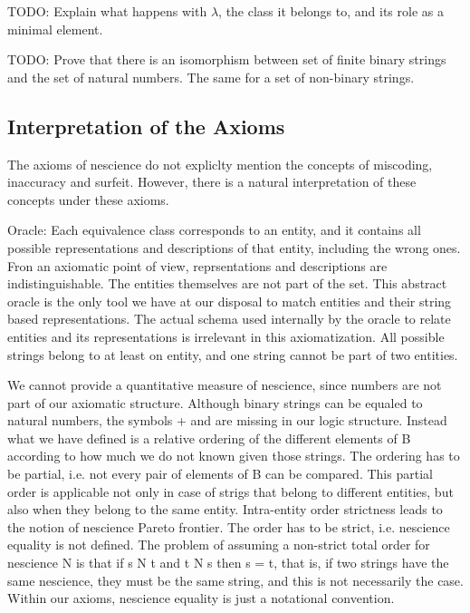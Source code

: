 {\color{red} TODO: Explain what happens with $\lambda$, the class it belongs to, and its role as a minimal element.}


{\color{red} TODO: Prove that there is an isomorphism between set of finite binary strings and the set of natural numbers. The same for a set of non-binary strings.}

%
%

\subsection{Interpretation of the Axioms}

The axioms of nescience do not expliclty mention the concepts of miscoding, inaccuracy and surfeit. However, there is a natural interpretation of these concepts under these axioms.


Oracle: Each equivalence class corresponds to an entity, and it contains all possible representations
and descriptions of that entity, including the wrong ones. Fron an axiomatic point of view,
reprsentations and descriptions are indistinguishable. The entities themselves are not part of the
set. This abstract oracle is the only tool we have at our disposal to match entities and their
string based representations. The actual schema used internally by the oracle to relate entities and
its representations is irrelevant in this axiomatization. All possible strings belong to at least on
entity, and one string cannot be part of two entities.

We cannot provide a quantitative measure of nescience, since numbers are not part of our
axiomatic structure. Although binary strings can be equaled to natural numbers, the symbols +
and  are missing in our logic structure. Instead what we have defined is a relative ordering of
the different elements of B according to how much we do not known given those strings. The
ordering has to be partial, i.e. not every pair of elements of B can be compared. This partial order
is applicable not only in case of strigs that belong to different entities, but also when they belong to
the same entity. Intra-entity order strictness leads to the notion of nescience Pareto frontier. The
order has to be strict, i.e. nescience equality is not defined. The problem of assuming a non-strict
total order for nescience N is that if s N t and t N s then s = t, that is, if two strings have the
same nescience, they must be the same string, and this is not necessarily the case. Within our
axioms, nescience equality is just a notational convention.

